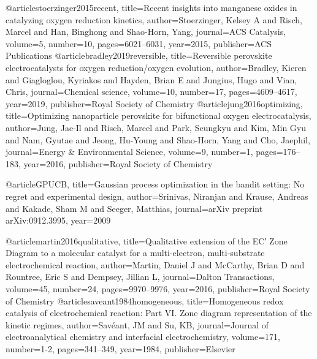 @article{stoerzinger2015recent,
  title={Recent insights into manganese oxides in catalyzing oxygen reduction kinetics},
  author={Stoerzinger, Kelsey A and Risch, Marcel and Han, Binghong and Shao-Horn, Yang},
  journal={ACS Catalysis},
  volume={5},
  number={10},
  pages={6021--6031},
  year={2015},
  publisher={ACS Publications}
}
@article{bradley2019reversible,
  title={Reversible perovskite electrocatalysts for oxygen reduction/oxygen evolution},
  author={Bradley, Kieren and Giagloglou, Kyriakos and Hayden, Brian E and Jungius, Hugo and Vian, Chris},
  journal={Chemical science},
  volume={10},
  number={17},
  pages={4609--4617},
  year={2019},
  publisher={Royal Society of Chemistry}
}
@article{jung2016optimizing,
  title={Optimizing nanoparticle perovskite for bifunctional oxygen electrocatalysis},
  author={Jung, Jae-Il and Risch, Marcel and Park, Seungkyu and Kim, Min Gyu and Nam, Gyutae and Jeong, Hu-Young and Shao-Horn, Yang and Cho, Jaephil},
  journal={Energy \& Environmental Science},
  volume={9},
  number={1},
  pages={176--183},
  year={2016},
  publisher={Royal Society of Chemistry}
}

@article{GPUCB,
  title={Gaussian process optimization in the bandit setting: No regret and experimental design},
  author={Srinivas, Niranjan and Krause, Andreas and Kakade, Sham M and Seeger, Matthias},
  journal={arXiv preprint arXiv:0912.3995},
  year={2009}
}

@article{martin2016qualitative,
  title={Qualitative extension of the EC′ Zone Diagram to a molecular catalyst for a multi-electron, multi-substrate electrochemical reaction},
  author={Martin, Daniel J and McCarthy, Brian D and Rountree, Eric S and Dempsey, Jillian L},
  journal={Dalton Transactions},
  volume={45},
  number={24},
  pages={9970--9976},
  year={2016},
  publisher={Royal Society of Chemistry}
}
@article{saveant1984homogeneous,
  title={Homogeneous redox catalysis of electrochemical reaction: Part VI. Zone diagram representation of the kinetic regimes},
  author={Sav{\'e}ant, JM and Su, KB},
  journal={Journal of electroanalytical chemistry and interfacial electrochemistry},
  volume={171},
  number={1-2},
  pages={341--349},
  year={1984},
  publisher={Elsevier}
}